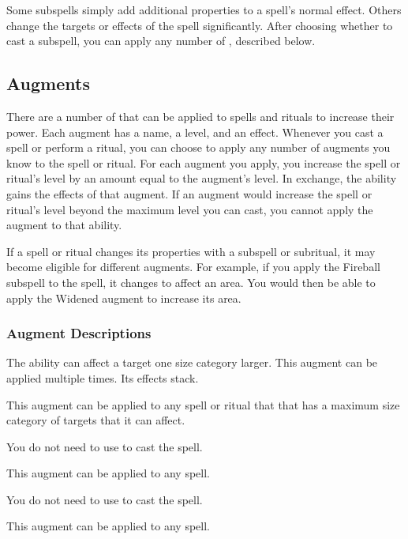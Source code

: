         Some subspells simply add additional properties to a spell's normal effect.
        Others change the targets or effects of the spell significantly.
        After choosing whether to cast a subspell, you can apply any number of , described below.

    \subsection{Augments}\label{Augments}
        There are a number of  that can be applied to spells and rituals to increase their power.
        Each augment has a name, a level, and an effect.
        Whenever you cast a spell or perform a ritual, you can choose to apply any number of augments you know to the spell or ritual.
        For each augment you apply, you increase the spell or ritual's level by an amount equal to the augment's level.
        In exchange, the ability gains the effects of that augment.
        If an augment would increase the spell or ritual's level beyond the maximum level you can cast, you cannot apply the augment to that ability.

        If a spell or ritual changes its properties with a subspell or subritual, it may become eligible for different augments.
        For example, if you apply the Fireball subspell to the  spell, it changes to affect an area.
        You would then be able to apply the Widened augment to increase its area.

        \subsubsection{Augment Descriptions}\label{Augment Descriptions}

             The ability can affect a target one size category larger.
            This augment can be applied multiple times.
            Its effects stack.
            \par This augment can be applied to any spell or ritual that that has a maximum size category of targets that it can affect.

             You do not need to use  to cast the spell.
            \par This augment can be applied to any spell.

             You do not need to use  to cast the spell.
            \par This augment can be applied to any spell.

